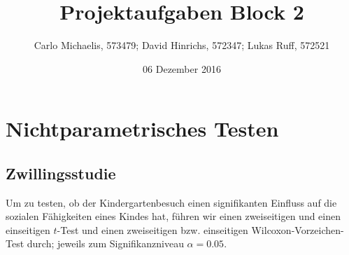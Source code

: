 \documentclass[10pt,]{article}
\title{Projektaufgaben Block 2}
\author{Carlo Michaelis, 573479; David Hinrichs, 572347; Lukas Ruff, 572521}
\date{06 Dezember 2016}
\begin{document}
\maketitle

\section{Nichtparametrisches Testen}\label{nichtparametrisches-testen}

\subsection{Zwillingsstudie}\label{zwillingsstudie}

Um zu testen, ob der Kindergartenbesuch einen signifikanten Einfluss auf
die sozialen Fähigkeiten eines Kindes hat, führen wir einen zweiseitigen
und einen einseitigen \(t\)-Test und einen zweiseitigen bzw. einseitigen
Wilcoxon-Vorzeichen-Test durch; jeweils zum Signifikanzniveau
\(\alpha = 0.05\).
\end{document}
